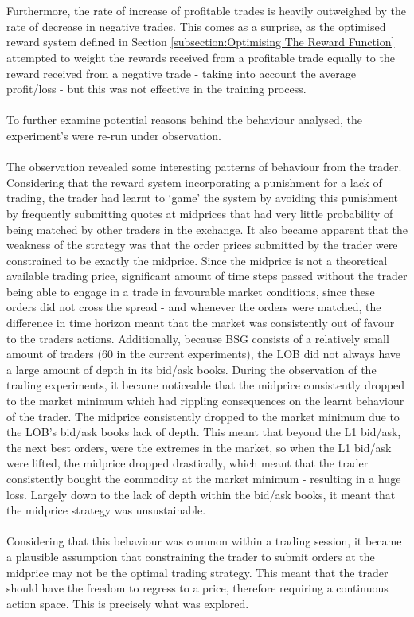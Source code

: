 \documentclass[ %
                    author={Ashwinder Khurana},
                supervisor={Prof Dave Cliff},
                    degree={MEng},
                     title={The Deeply Reinforced Trader},
                  subtitle={},
                      type={enterprise},
                      year={2020} ]{dissertation}
\begin{document}
{\\
\\
Furthermore, the rate of increase of profitable trades is heavily outweighed by the rate of decrease in negative trades. This comes as a surprise, as the optimised reward system defined in Section \ref{subsection:Optimising The Reward Function} attempted to weight the rewards received from a profitable trade equally to the reward received from a negative trade - taking into account the average profit/loss - but this was not effective in the training process. 
\\
\\
To further examine potential reasons behind the behaviour analysed, the experiment's were re-run under observation. 
\\
\\
The observation revealed some interesting patterns of behaviour from the trader. Considering that the reward system incorporating a punishment for a lack of trading, the trader had learnt to \enquote*{game} the system by avoiding this punishment by frequently submitting quotes at midprices that had very little probability of being matched by other traders in the exchange.
It also became apparent that the weakness of the strategy was that the order prices submitted by the trader were constrained to be exactly the midprice. Since the midprice is not a theoretical available trading price, significant amount of time steps passed without the trader being able to engage in a trade in favourable market conditions, since these orders did not cross the spread - and whenever the orders were matched, the difference in time horizon meant that the market was consistently out of favour to the traders actions. Additionally, because BSG consists of a relatively small amount of traders (60 in the current experiments), the LOB did not always have a large amount of depth in its bid/ask books. During the observation of the trading experiments, it became noticeable that the midprice consistently dropped to the market minimum which had rippling consequences on the learnt behaviour of the trader. The midprice consistently dropped to the market minimum due to the LOB's bid/ask books lack of depth. This meant that beyond the L1 bid/ask, the next best orders, were the extremes in the market, so when the L1 bid/ask were lifted, the midprice dropped drastically, which meant that the trader consistently bought the commodity at the market minimum - resulting in a huge loss. Largely down to the lack of depth within the bid/ask books, it meant that the midprice strategy was unsustainable.
\\
\\
Considering that this behaviour was common within a trading session, it became a plausible assumption that constraining the trader to submit orders at the midprice may not be the optimal trading strategy. This meant that the trader should have the freedom to regress to a price, therefore requiring a continuous action space. This is precisely what was explored. 


}
\end{document}
